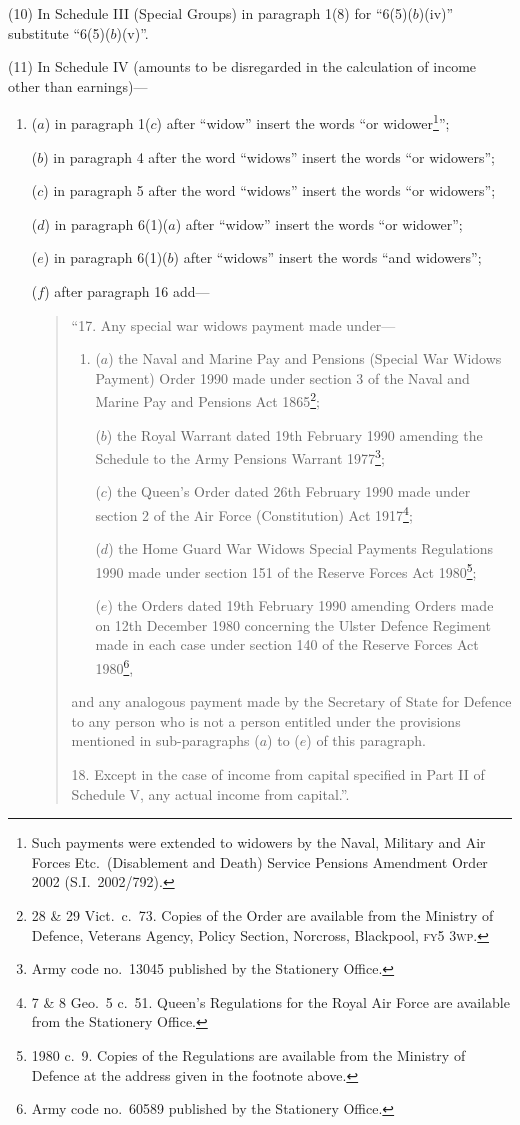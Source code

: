 \documentclass[12pt,a4paper]{article}
\begin{document}
(10) In Schedule III (Special Groups) in paragraph 1(8) for “6(5)($b$)(iv)” substitute “6(5)($b$)(v)”.

(11) In Schedule IV (amounts to be disregarded in the calculation of income other than earnings)—
\begin{enumerate}\item[]
($a$) in paragraph 1($c$)  after “widow” insert the words “or widower\footnote{Such payments were extended to widowers by the Naval, Military and Air Forces Etc.\ (Disablement and Death) Service Pensions Amendment Order 2002 (S.I.\ 2002/792).}”;

($b$) in paragraph 4 after the word “widows” insert the words “or widowers”;

($c$) in paragraph 5 after the word “widows” insert the words “or widowers”;

($d$) in paragraph 6(1)($a$)  after “widow” insert the words “or widower”;

($e$) in paragraph 6(1)($b$)  after “widows” insert the words “and widowers”;

($f$) after paragraph 16 add—
\begin{quotation}
“17.  Any special war widows payment made under—
\begin{enumerate}\item[]
($a$) the Naval and Marine Pay and Pensions (Special War Widows Payment) Order 1990 made under section 3 of the Naval and Marine Pay and Pensions Act 1865\footnote{28 \& 29 Vict.\ c.\ 73. Copies of the Order are available from the Ministry of Defence, Veterans Agency, Policy Section, Norcross, Blackpool, \textsc{\lowercase{FY5 3WP}}.};

($b$) the Royal Warrant dated 19th February 1990 amending the Schedule to the Army Pensions Warrant 1977\footnote{Army code no.\ 13045 published by the Stationery Office.};

($c$) the Queen’s Order dated 26th February 1990 made under section 2 of the Air Force (Constitution) Act 1917\footnote{7 \& 8 Geo.\ 5 c.\ 51. Queen’s Regulations for the Royal Air Force are available from the Stationery Office.};

($d$) the Home Guard War Widows Special Payments Regulations 1990 made under section 151 of the Reserve Forces Act 1980\footnote{1980 c.\ 9. Copies of the Regulations are available from the Ministry of Defence at the address given in the footnote above.};

($e$) the Orders dated 19th February 1990 amending Orders made on 12th December 1980 concerning the Ulster Defence Regiment made in each case under section 140 of the Reserve Forces Act 1980\footnote{Army code no.\ 60589 published by the Stationery Office.},
\end{enumerate}
and any analogous payment made by the Secretary of State for Defence to any person who is not a person entitled under the provisions mentioned in sub-paragraphs ($a$)  to ($e$)  of this paragraph.

\medskip

18.  Except in the case of income from capital specified in Part II of Schedule V, any actual income from capital.”.
\end{quotation}
\end{enumerate}
\end{document}
